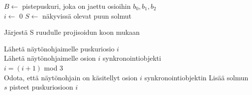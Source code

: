 \perusalgoritmi


$B \gets$ pistepuskuri, joka on jaettu osioihin $b_0, b_1, b_2$\\
$i \gets$ 0
$S \gets$ näkyvissä olevat puun solmut 

Järjestä S ruudulle projisoidun koon mukaan

 {
     {
        Lähetä näytönohjaimelle puskuriosio $i$\\
        Lähetä näytönohjaimelle osion $i$ synkronointiobjekti\\
        $i = (i + 1)$ mod $3$\\
        Odota, että näytönohjain on käsitellyt osion $i$ synkronointiobjektin
    }
     {
        Lisää solmun $s$ pisteet puskuriosioon $i$
    }
}